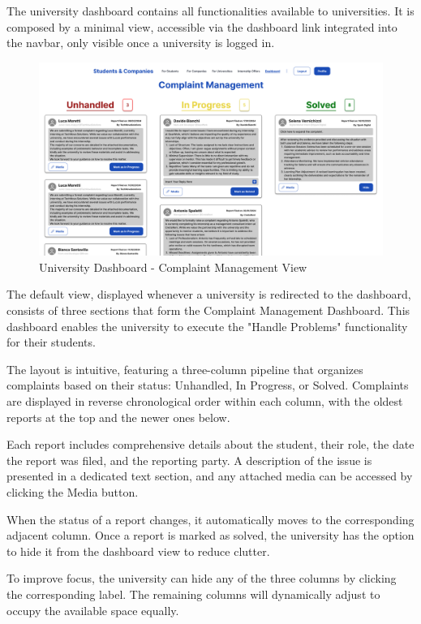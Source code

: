 The university dashboard contains all functionalities available to universities. It is composed by a minimal view, accessible via the dashboard link integrated into the navbar, only visible once a university is logged in.

\begin{figure} [H]
    \begin{center}
        \includegraphics[width=0.9\linewidth]{LaTeXCode/images/UI/University Dashboard - Complaint Management View.png}
        \caption{University Dashboard - Complaint Management View}
        \label{fig: dashboard_university_complaint}
    \end{center}
\end{figure}

The default view, displayed whenever a university is redirected to the dashboard, consists of three sections that form the Complaint Management Dashboard. This dashboard enables the university to execute the "Handle Problems" functionality for their students.

The layout is intuitive, featuring a three-column pipeline that organizes complaints based on their status: Unhandled, In Progress, or Solved. Complaints are displayed in reverse chronological order within each column, with the oldest reports at the top and the newer ones below.

Each report includes comprehensive details about the student, their role, the date the report was filed, and the reporting party. A description of the issue is presented in a dedicated text section, and any attached media can be accessed by clicking the Media button.

When the status of a report changes, it automatically moves to the corresponding adjacent column. Once a report is marked as solved, the university has the option to hide it from the dashboard view to reduce clutter.

To improve focus, the university can hide any of the three columns by clicking the corresponding label. The remaining columns will dynamically adjust to occupy the available space equally.
